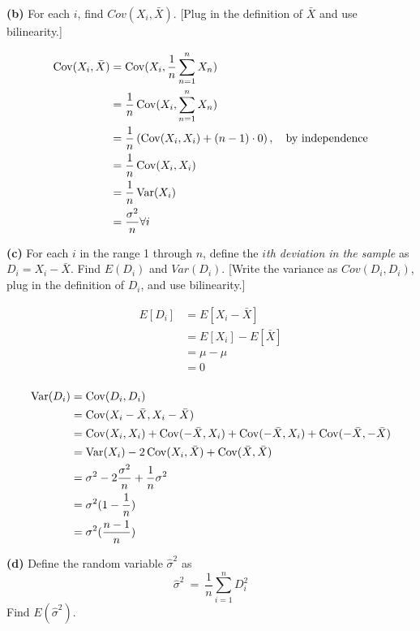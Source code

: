 \documentclass[11pt]{article}
\begin{document}
 


\textbf{(b)} For each \(i\), find \(Cov(X_i, \bar{X})\). {[}Plug in the
definition of \(\bar{X}\) and use bilinearity.{]}

\begin{align*}
	\operatorname{Cov}(X_{i}, \bar X) &= \operatorname{Cov}(X_{i}, \frac{1}{n}\sum_{n=1}^{n}X_{n}) \\
	&= \frac{1}{n}\operatorname{Cov}(X_{i}, \sum_{n=1}^{n}X_{n}) \\
	&= \frac{1}{n}\left( \operatorname{Cov}(X_{i}, X_{i}) + (n-1) \cdot 0\right), \quad \text{by independence} \\
	&= \frac{1}{n}\operatorname{Cov}(X_{i}, X_{i}) \\
	&= \frac{1}{n}\operatorname{Var}(X_{i}) \\
	&= \frac{\sigma^{2}}{n} \forall i \\
\end{align*}


\textbf{(c)} For each \(i\) in the range 1 through \(n\), define the
\emph{\(i\)th deviation in the sample} as \(D_i = X_i - \bar{X}\). Find
\(E(D_i)\) and \(Var(D_i)\). {[}Write the variance as \(Cov(D_i, D_i)\),
plug in the definition of \(D_i\), and use bilinearity.{]}

\begin{align*}
	E[D_{i}] &= E[X_{i} - \bar X] \\
	&= E[X_{i}] - E[\bar X] \\
	&= \mu  - \mu  \\
	&= 0 \\
\end{align*}

\begin{align*}
	\operatorname{Var}(D_{i}) &= \operatorname{Cov}(D_{i}, D_{i}) \\
	&= \operatorname{Cov}(X_{i}-\bar X, X_{i} - \bar X) \\
	&= \operatorname{Cov}(X_{i}, X_{i}) + \operatorname{Cov}(-\bar X, X_{i}) + \operatorname{Cov}(-\bar X, X_{i}) + \operatorname{Cov}(-\bar X, - \bar X) \\
	&= \operatorname{Var}(X_{i}) -2 \operatorname{Cov}(X_{i}, \bar X) + \operatorname{Cov}(\bar X, \bar X) \\
	&= \sigma^{2} -2 \frac{\sigma^{2}}{n} + \frac{1}{n}\sigma^{2} \\
	&= \sigma^{2}(1-\frac{1}{n}) \\
	&= \sigma^{2}(\frac{n-1}{n}) \\
\end{align*}


\textbf{(d)} Define the random variable \(\hat{\sigma}^2\) as \[
\hat{\sigma}^2 ~ = ~ \frac{1}{n} \sum_{i=1}^n D_i^2
\] Find \(E(\hat{\sigma}^2)\).
\end{document}
